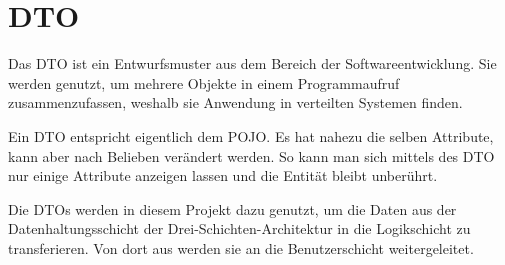 \section{\acf{DTO}}
\label{sec:dto}
Das \ac{DTO} ist ein Entwurfsmuster aus dem Bereich der Softwareentwicklung.
Sie werden genutzt, um mehrere Objekte in einem Programmaufruf zusammenzufassen, weshalb sie Anwendung in verteilten Systemen finden.

Ein \ac{DTO} entspricht eigentlich dem \ac{POJO}.
Es hat nahezu die selben Attribute, kann aber nach Belieben verändert werden.
So kann man sich mittels des \ac{DTO} nur einige Attribute anzeigen lassen und die Entität bleibt unberührt.

Die \acsp{DTO} werden in diesem Projekt dazu genutzt, um die Daten aus der Datenhaltungsschicht der Drei-Schichten-Architektur in die Logikschicht zu transferieren.
Von dort aus werden sie an die Benutzerschicht weitergeleitet.